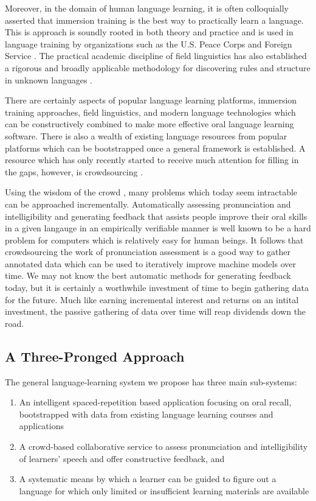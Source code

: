 Moreover, in the domain of human language learning, it is often colloquially asserted that immersion training is the best way to practically learn a language. This is approach is soundly rooted in both theory and practice and is used in language training by organizations such as the U.S. Peace Corps and Foreign Service \cite{swain1998interaction} \cite{genesee1987learning} \cite{johnson1997immersion} \cite{howard2005second} \cite{leeds1990notes}. The practical academic discipline of field linguistics has also established a rigorous and broadly applicable methodology for discovering rules and structure in unknown languages \cite{seuren1966grammar} \cite{crowley2007field} \cite{lawler1998using}. 

There are certainly aspects of popular language learning platforms, immersion training approaches, field linguistics, and modern language technologies which can be constructively combined to make more effective oral language learning software. There is also a wealth of existing language resources from popular platforms which can be bootstrapped once a general framework is established. A resource which has only recently started to receive much attention for filling in the gaps, however, is crowdsourcing \cite{eskenazi2013crowdsourcing} \cite{parent2011speaking} \cite{callison2010creating}.

Using the wisdom of the crowd \cite{surowiecki2005wisdom}, many problems which today seem intractable can be approached incrementally. Automatically assessing pronunciation and intelligibility and generating feedback that assists people improve their oral skills in a given langauge in an empirically verifiable manner is well known to be a hard problem for computers which is relatively easy for human beings. It follows that crowdsourcing the work of pronunciation assessment is a good way to gather annotated data which can be used to iteratively improve machine models over time. We may not know the best automatic methods for generating feedback today, but it is certainly a worthwhile investment of time to begin gathering data for the future. Much like earning incremental interest and returns on an intital investment, the passive gathering of data over time will reap dividends down the road.

\subsection{A Three-Pronged Approach} 
The general language-learning system we propose has three main sub-systems:
\begin{enumerate}
\item An intelligent spaced-repetition based application focusing on oral recall, bootstrapped with data from existing language learning courses and applications
\item A crowd-based collaborative service to assess pronunciation and intelligibility of learners' speech and offer constructive feedback, and
\item A systematic means by which a learner can be guided to figure out a language for which only limited or insufficient learning materials are available
\end{enumerate}
